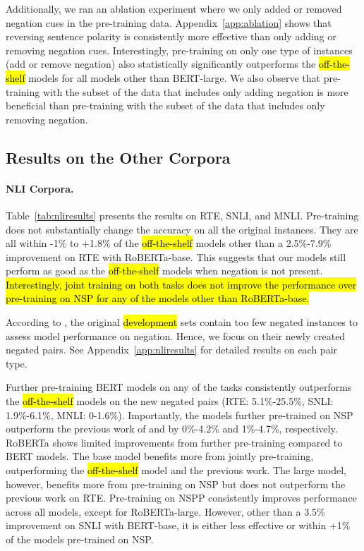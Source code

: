 Additionally, 
we ran an ablation experiment where we only added or removed negation cues in the pre-training data.
Appendix~\ref{app:ablation} shows that reversing sentence polarity is
consistently more effective than only adding or removing negation cues.
Interestingly, 
pre-training on only one type of instances (add or remove negation) 
also statistically significantly outperforms the \hl{off-the-shelf} models for all models other than {BERT-large}.
We also observe that pre-training with the subset of the data that includes only adding negation
is more beneficial than pre-training with the subset of the data that includes only removing negation.


\subsection{Results on the Other Corpora}
\paragraph{NLI Corpora.}
Table~\ref{tab:nliresults} presents the results on RTE, SNLI, and MNLI.
Pre-training does not substantially change the accuracy on all the original instances. 
They are all within -1\% to +1.8\% of the \hl{off-the-shelf} models other than a 2.5\%-7.9\% improvement on RTE with {RoBERTa-base}.
This suggests that our models still perform as good as the \hl{off-the-shelf} models when negation is not present.
\hl{Interestingly, joint training on both tasks does not improve the performance over pre-training on NSP for any of the models other than RoBERTa-base.} 

According to \citet{hossain-etal-2020-analysis}, 
the original \hl{development} sets contain too few negated instances to assess model performance on negation. 
Hence, we focus on their newly created negated pairs. 
See Appendix~\ref{app:nliresults} for detailed results on each pair type.

Further pre-training {BERT} models on any of the tasks consistently outperforms the \hl{off-the-shelf} models on the new negated pairs
(RTE: 5.1\%-25.5\%, SNLI: 1.9\%-6.1\%, MNLI: 0-1.6\%). 
Importantly, the models further pre-trained on NSP outperform the previous work of 
\citet{hosseini-etal-2021-understanding} and \citet{singh-etal-2023-nlms} 
by 0\%-4.2\% and 1\%-4.7\%, respectively.
{RoBERTa} shows limited improvements from further pre-training compared to {BERT} models. 
The base model benefits more from jointly pre-training, 
outperforming the \hl{off-the-shelf} model and the previous work. 
The large model, however, benefits more from pre-training on NSP but does not outperform the previous work on RTE.
Pre-training on NSPP consistently improves performance across all models, except for {RoBERTa-large}.
However, other than a 3.5\% improvement on SNLI with {BERT-base},
it is either less effective or within +1\% of the models pre-trained on NSP.

